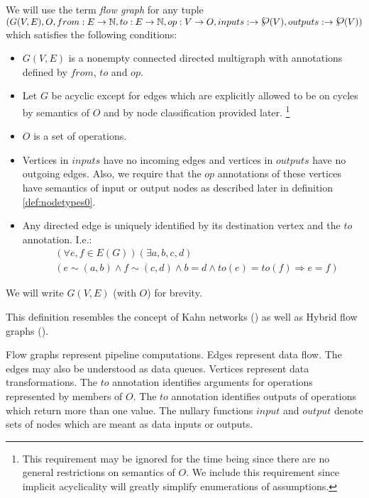   We will use the term \emph{flow graph} for any tuple $(G(V,E),O,from:E \arrow \N, to:E \arrow \N, op:V \arrow O,\\ inputs: \arrow \powerset(V), outputs: \arrow \powerset(V) )$ which satisfies the following conditions:
\begin{itemize}
  \item $G(V,E)$ is a nonempty connected directed multigraph with annotations defined by $from$, $to$ and $op$.  
  \item Let $G$ be acyclic except for edges which are explicitly allowed to be on cycles by semantics of $O$ and by node classification provided later. \footnote{This requirement may be ignored for the time being since there are no general restrictions on semantics of $O$. We include this requirement since implicit acyclicality will greatly simplify enumerations of assumptions.}
  \item $O$ is a set of operations.
  \item Vertices in $inputs$ have no incoming edges and vertices in $outputs$ have no outgoing edges. Also, we require that the $op$ annotations of these vertices have semantics of input or output nodes as described later in definition \ref{def:nodetypes0}.
  \item Any directed edge is uniquely identified by its destination vertex and the $to$ annotation. I.e.:
    \begin{align*} &(\forall{e,f \in E(G)})(\exists a,b,c,d) \\ &(e \sim (a,b) \land f \sim (c,d) \land b = d \land to(e) = to(f) \Rightarrow e = f )\end{align*}
\end {itemize}
    We will write $G(V,E)$ (with $O$) for brevity.
\myenddef

    This definition resembles the concept of Kahn networks (\cite{kahn}) as well as Hybrid flow graphs (\cite{hfg}).

  Flow graphs represent pipeline computations. Edges represent data flow. The edges may also be understood as data queues. Vertices represent data transformations. The $to$ annotation identifies arguments for operations represented by members of $O$. The $to$ annotation identifies outputs of operations which return more than one value. The nullary functions $input$ and $output$ denote sets of nodes which are meant as data inputs or outputs.

